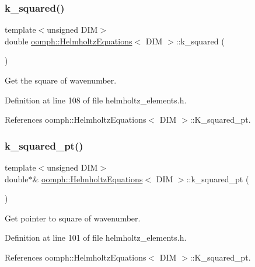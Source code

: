 \subsubsection{\texorpdfstring{k\+\_\+squared()}{k\_squared()}}
{\footnotesize\ttfamily template$<$unsigned D\+IM$>$ \\
double \hyperlink{classoomph_1_1HelmholtzEquations}{oomph\+::\+Helmholtz\+Equations}$<$ D\+IM $>$\+::k\+\_\+squared (\begin{DoxyParamCaption}{ }\end{DoxyParamCaption})\hspace{0.3cm}{\ttfamily [inline]}}



Get the square of wavenumber. 



Definition at line 108 of file helmholtz\+\_\+elements.\+h.



References oomph\+::\+Helmholtz\+Equations$<$ D\+I\+M $>$\+::\+K\+\_\+squared\+\_\+pt.

\mbox{\label{classoomph_1_1HelmholtzEquations_af5812d14d424a8f6cff5884863576cb3}} 
\subsubsection{\texorpdfstring{k\+\_\+squared\+\_\+pt()}{k\_squared\_pt()}}
{\footnotesize\ttfamily template$<$unsigned D\+IM$>$ \\
double$\ast$\& \hyperlink{classoomph_1_1HelmholtzEquations}{oomph\+::\+Helmholtz\+Equations}$<$ D\+IM $>$\+::k\+\_\+squared\+\_\+pt (\begin{DoxyParamCaption}{ }\end{DoxyParamCaption})\hspace{0.3cm}{\ttfamily [inline]}}



Get pointer to square of wavenumber. 



Definition at line 101 of file helmholtz\+\_\+elements.\+h.



References oomph\+::\+Helmholtz\+Equations$<$ D\+I\+M $>$\+::\+K\+\_\+squared\+\_\+pt.



